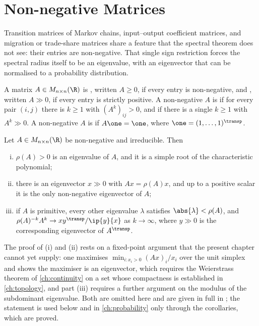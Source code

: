 \section{Non-negative Matrices}\label{sec:lin-perron}

Transition matrices of Markov chains, input--output coefficient matrices, and
migration or trade-share matrices share a feature that the spectral theorem does
not see: their entries are non-negative. That single sign restriction forces the
spectral radius itself to be an eigenvalue, with an eigenvector that can be
normalised to a probability distribution.

\begin{definition}\label{def:nonneg-matrix}
	A matrix $A\in M_{n\times n}(\R)$ is ,
	written $A\geq0$, if every entry is non-negative, and , written
	$A\gg0$, if every entry is strictly positive. A non-negative $A$ is
	 if for every pair $(i,j)$ there is
	$k\geq1$ with $(A^{k})_{ij}>0$, and  if
	there is a single $k\geq1$ with $A^{k}\gg0$. A non-negative $A$ is
	 if $A\one=\one$, where
	$\one=(1,\dots,1)^{\transp}$.
\end{definition}

\begin{theorem}\label{thm:perron-frobenius}
	Let $A\in M_{n\times n}(\R)$ be non-negative and irreducible. Then
	\begin{enumerate}[(i)]
		\item $\rho(A)>0$ is an eigenvalue of $A$, and it is a simple root of the
		      characteristic polynomial;
		\item there is an eigenvector $x\gg0$ with $Ax=\rho(A)x$, and up to a positive
		      scalar it is the only non-negative eigenvector of $A$;
		\item if $A$ is primitive, every other eigenvalue $\lambda$ satisfies
		      $\abs{\lambda}<\rho(A)$, and
		      $\rho(A)^{-k}A^{k}\to xy^{\transp}/\ip{y}{x}$ as $k\to\infty$, where
		      $y\gg0$ is the corresponding eigenvector of $A^{\transp}$.
	\end{enumerate}
\end{theorem}

The proof of (i) and (ii) rests on a fixed-point argument that the present
chapter cannot yet supply: one maximises $\min_{i:x_i>0}(Ax)_i/x_i$ over the unit
simplex and shows the maximiser is an eigenvector, which requires the
Weierstrass theorem of \autoref{ch:continuity} on a set whose compactness is
established in \autoref{ch:topology}, and part (iii) requires a further
argument on the modulus of the subdominant eigenvalue. Both are omitted here
and are given in full in \textcite[Ch.~8]{meyer2000matrix}; the statement is used
below and in \autoref{ch:probability} only through the corollaries, which are
proved.

